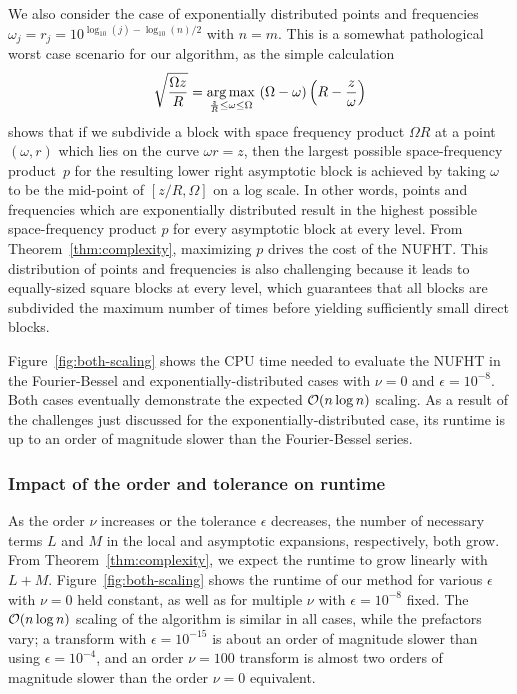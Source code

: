 We also consider the case of exponentially distributed points and frequencies
$\omega_j = r_j = 10^{\log_{10}(j) - \log_{10}(n)/2}$ with $n = m$. This is a
somewhat pathological worst case scenario for our algorithm, as the simple
calculation
\begin{equation}
  \sqrt{\frac{\Omega z}{R}} = \operatorname*{arg\,max}_{\frac{z}{R} \leq \omega \leq \Omega} \ (\Omega - \omega)\left(R - \frac{z}{\omega}\right)
\end{equation}
shows that if we subdivide a block with space frequency product $\Omega R$ at a
point $(\omega, r)$ which lies on the curve $\omega r = z$, then the largest
possible space-frequency product~$p$ for the resulting lower right asymptotic
block is achieved by taking $\omega$ to be the mid-point of $[z/R, \Omega]$ on a
log scale. In other words, points and frequencies which are exponentially
distributed result in the highest possible space-frequency product $p$ for every
asymptotic block at every level. From Theorem~\ref{thm:complexity}, maximizing
$p$ drives the cost of the NUFHT. This distribution of points and frequencies is
also challenging because it leads to equally-sized square blocks at every level,
which guarantees that all blocks are subdivided the maximum number of times
before yielding sufficiently small direct blocks.

Figure~\ref{fig:both-scaling} shows the CPU time needed to evaluate the NUFHT in
the Fourier-Bessel and exponentially-distributed cases with $\nu=0$ and
$\epsilon=10^{-8}$. Both cases eventually demonstrate the expected $\mathcal{O}(n\log
n)$ scaling. As a result of the challenges just discussed for the
exponentially-distributed case, its runtime is up to an order of magnitude
slower than the Fourier-Bessel series.

\subsubsection{Impact of the order and tolerance on runtime} 
As the order $\nu$ increases or the tolerance $\epsilon$ decreases, the number
of necessary terms $L$ and $M$ in the local and asymptotic expansions,
respectively, both grow. From Theorem~\ref{thm:complexity}, we expect the
runtime to grow linearly with $L + M$. Figure~\ref{fig:both-scaling} shows the
runtime of our method for various $\epsilon$ with $\nu=0$ held constant, as well
as for multiple $\nu$ with $\epsilon=10^{-8}$ fixed. The $\mathcal{O}(n\log n)$ scaling
of the algorithm is similar in all cases, while the prefactors vary; a transform
with $\epsilon = 10^{-15}$ is about an order of magnitude slower than using
$\epsilon = 10^{-4}$, and an order $\nu=100$ transform is almost two orders of
magnitude slower than the order $\nu=0$ equivalent.

